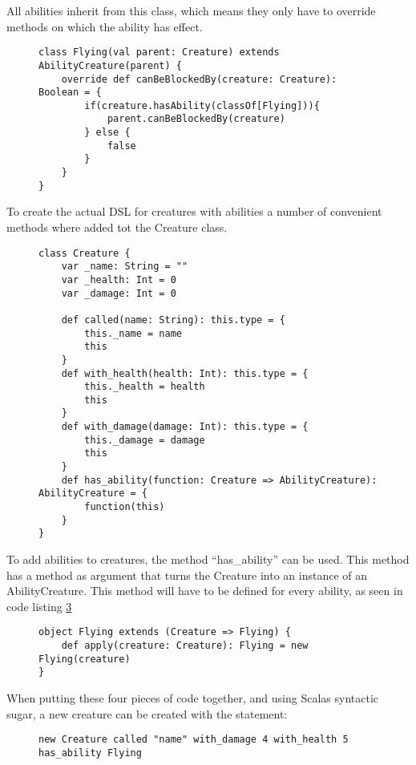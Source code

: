 \documentclass[twocolumn]{phdsymp}
\begin{document}
All abilities inherit from this class, which means they only have to override methods on which the ability has effect.
\begin{figure}[H]
\label{Code Listing 2}
\begin{verbatim}
class Flying(val parent: Creature) extends AbilityCreature(parent) {
    override def canBeBlockedBy(creature: Creature): Boolean = {
        if(creature.hasAbility(classOf[Flying])){
            parent.canBeBlockedBy(creature)
        } else {
            false
        }
    }
}
\end{verbatim}
\end{figure}
To create the actual DSL for creatures with abilities a number of convenient methods where added tot the Creature class.
\begin{figure}[H]
\label{Code Listing 3}
\begin{verbatim}
class Creature {
    var _name: String = ""
    var _health: Int = 0
    var _damage: Int = 0

    def called(name: String): this.type = {
        this._name = name
        this
    }
    def with_health(health: Int): this.type = {
        this._health = health
        this
    }
    def with_damage(damage: Int): this.type = {
        this._damage = damage
        this
    }
    def has_ability(function: Creature => AbilityCreature): AbilityCreature = {
        function(this)
    }
}
\end{verbatim}
\end{figure}
To add abilities to creatures, the method ``has\_ability'' can be used. This method has a method as argument that turns the Creature into an instance of an AbilityCreature. This method will have to be defined for every ability, as seen in code listing \ref{Code Listing 4}
\begin{figure}[H]
\label{Code Listing 4}
\begin{verbatim}
object Flying extends (Creature => Flying) {
    def apply(creature: Creature): Flying = new Flying(creature)
}
\end{verbatim}
\end{figure}
When putting these four pieces of code together, and using Scalas syntactic sugar, a new creature can be created with the statement:
\begin{figure}[H]
\label{Code Listing 5}
\begin{verbatim}
new Creature called "name" with_damage 4 with_health 5 has_ability Flying
\end{verbatim}
\end{figure}
\end{document}

